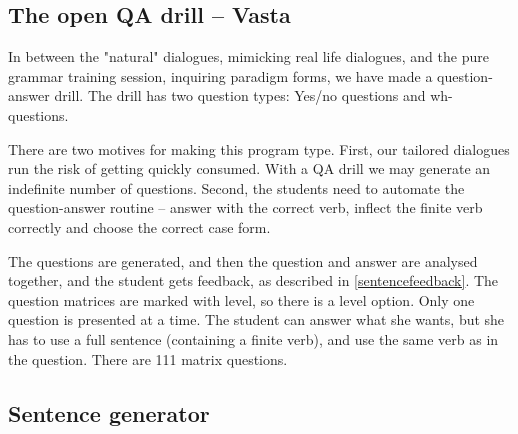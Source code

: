 \documentclass[11pt]{article}
\begin{document}
\subsection{The open QA drill -- Vasta}	

In between the "natural" dialogues, mimicking real life dialogues, and the pure grammar training session, inquiring paradigm forms, we have made  a question-answer drill. The drill has two question types: Yes/no questions and wh-questions. 

There are two motives for making this program type. First, our tailored dialogues run the risk of getting quickly consumed. With a QA drill we may generate an indefinite number of questions. Second, the students need to automate the question-answer routine -- answer with the correct verb, inflect the finite verb correctly and choose the correct case form.

The questions are generated, and then the question and answer are analysed together, and the student gets feedback, as described in \ref{sentencefeedback}. The question matrices are marked with level, so there is a level option. Only one question is presented at a time. The student can answer what she wants, but she has to use a full sentence (containing a finite verb), and use the same verb as in the question. There are 111 matrix questions.



\subsection{Sentence generator}\label{set}
\end{document}
